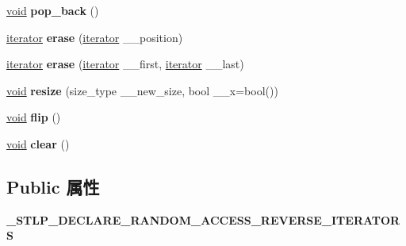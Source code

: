 \begin{DoxyCompactItemize}
\item 
\mbox{\label{class_____b_v_e_c_t_o_r___q_u_a_l_i_f_i_e_d_ae1443a784e58bd94f0fcaa606e681e98}} 
\hyperlink{interfacevoid}{void} {\bfseries pop\+\_\+back} ()
\item 
\mbox{\label{class_____b_v_e_c_t_o_r___q_u_a_l_i_f_i_e_d_aaba91539336c016452d15fc45e28430d}} 
\hyperlink{structiterator}{iterator} {\bfseries erase} (\hyperlink{structiterator}{iterator} \+\_\+\+\_\+position)
\item 
\mbox{\label{class_____b_v_e_c_t_o_r___q_u_a_l_i_f_i_e_d_a5ed16ac9681cc4a9dc1c248bc8f5a29e}} 
\hyperlink{structiterator}{iterator} {\bfseries erase} (\hyperlink{structiterator}{iterator} \+\_\+\+\_\+first, \hyperlink{structiterator}{iterator} \+\_\+\+\_\+last)
\item 
\mbox{\label{class_____b_v_e_c_t_o_r___q_u_a_l_i_f_i_e_d_ac59053d19370497f10c543c957372f31}} 
\hyperlink{interfacevoid}{void} {\bfseries resize} (size\+\_\+type \+\_\+\+\_\+new\+\_\+size, bool \+\_\+\+\_\+x=bool())
\item 
\mbox{\label{class_____b_v_e_c_t_o_r___q_u_a_l_i_f_i_e_d_ae6a985f13f431394c78d8c84b31ef0ea}} 
\hyperlink{interfacevoid}{void} {\bfseries flip} ()
\item 
\mbox{\label{class_____b_v_e_c_t_o_r___q_u_a_l_i_f_i_e_d_a48623a6f69cd765e55bac75907ca0e42}} 
\hyperlink{interfacevoid}{void} {\bfseries clear} ()
\end{DoxyCompactItemize}
\subsection*{Public 属性}
\begin{DoxyCompactItemize}
\item 
\mbox{\label{class_____b_v_e_c_t_o_r___q_u_a_l_i_f_i_e_d_ac16a302acb35132a8af9eaeb8c5acde3}} 
{\bfseries \+\_\+\+S\+T\+L\+P\+\_\+\+D\+E\+C\+L\+A\+R\+E\+\_\+\+R\+A\+N\+D\+O\+M\+\_\+\+A\+C\+C\+E\+S\+S\+\_\+\+R\+E\+V\+E\+R\+S\+E\+\_\+\+I\+T\+E\+R\+A\+T\+O\+RS}
\end{DoxyCompactItemize}
